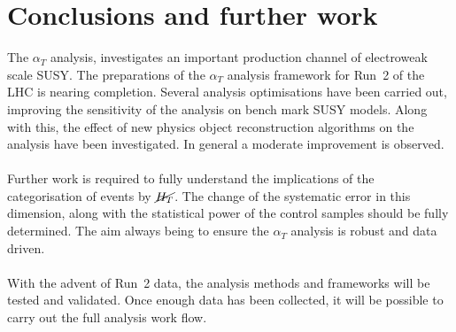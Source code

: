 \section{Conclusions and further work}
\label{sec:conclusion}

The $\alpha_T$ analysis, investigates an important production channel of electroweak scale SUSY. The preparations of the $\alpha_T$ analysis framework for Run~2 of the LHC is nearing completion. Several analysis optimisations have been carried out, improving the sensitivity of the analysis on bench mark SUSY models. Along with this, the effect of new physics object reconstruction algorithms on the analysis have been investigated. In general a moderate improvement is observed.
\\\\
Further work is required to fully understand the implications of the categorisation of events by $\cancel{H_T}$. The change of the systematic error in this dimension, along with the statistical power of the control samples should be fully determined. The aim always being to ensure the $\alpha_T$ analysis is robust and data driven.
\\\\
With the advent of Run~2 data, the analysis methods and frameworks will be tested and validated. Once enough data has been collected, it will be possible to carry out the full analysis work flow.
